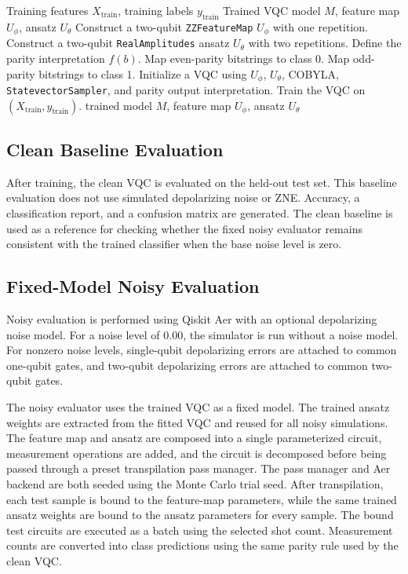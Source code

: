 \documentclass[conference]{IEEEtran}
\begin{document}
\begin{algorithm}[H]
\caption{Clean VQC Training}
\label{alg:vqc_training}
\begin{algorithmic}[1]
\Require Training features $X_{\mathrm{train}}$, training labels $y_{\mathrm{train}}$
\Ensure Trained VQC model $M$, feature map $U_{\phi}$, ansatz $U_{\theta}$
\State Construct a two-qubit \texttt{ZZFeatureMap} $U_{\phi}$ with one repetition.
\State Construct a two-qubit \texttt{RealAmplitudes} ansatz $U_{\theta}$ with two repetitions.
\State Define the parity interpretation $f(b)$.
\State Map even-parity bitstrings to class 0.
\State Map odd-parity bitstrings to class 1.
\State Initialize a VQC using $U_{\phi}$, $U_{\theta}$, COBYLA, \texttt{StatevectorSampler}, and parity output interpretation.
\State Train the VQC on $(X_{\mathrm{train}}, y_{\mathrm{train}})$.
\State \Return trained model $M$, feature map $U_{\phi}$, ansatz $U_{\theta}$
\end{algorithmic}
\end{algorithm}

\subsection{Clean Baseline Evaluation}

After training, the clean VQC is evaluated on the held-out test set. This
baseline evaluation does not use simulated depolarizing noise or ZNE. Accuracy,
a classification report, and a confusion matrix are generated. The clean
baseline is used as a reference for checking whether the fixed noisy evaluator
remains consistent with the trained classifier when the base noise level is zero.

\subsection{Fixed-Model Noisy Evaluation}

Noisy evaluation is performed using Qiskit Aer with an optional depolarizing
noise model. For a noise level of 0.00, the simulator is run without a noise
model. For nonzero noise levels, single-qubit depolarizing errors are attached
to common one-qubit gates, and two-qubit depolarizing errors are attached to
common two-qubit gates.

The noisy evaluator uses the trained VQC as a fixed model. The trained ansatz
weights are extracted from the fitted VQC and reused for all noisy simulations.
The feature map and ansatz are composed into a single parameterized circuit,
measurement operations are added, and the circuit is decomposed before being
passed through a preset transpilation pass manager. The pass manager and Aer
backend are both seeded using the Monte Carlo trial seed. After transpilation,
each test sample is bound to the feature-map parameters, while the same trained
ansatz weights are bound to the ansatz parameters for every sample. The bound
test circuits are executed as a batch using the selected shot count. Measurement
counts are converted into class predictions using the same parity rule used by
the clean VQC.
\end{document}

